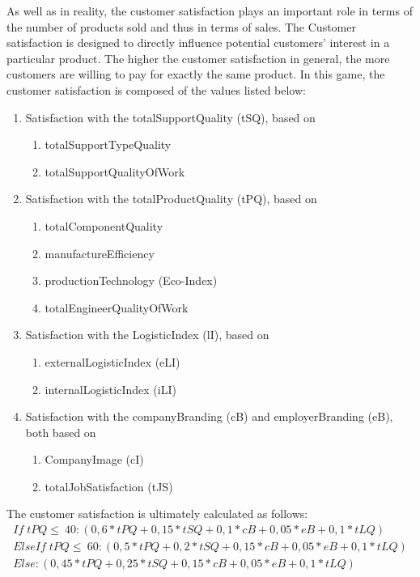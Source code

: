 As well as in reality, the customer satisfaction plays an important role in terms of the number of products sold and thus in terms of sales. %
The Customer satisfaction is designed to directly influence potential customers' interest in a particular product. The higher the customer satisfaction in general, the more customers are willing to pay for exactly the same product. 
In this game, the customer satisfaction is composed of the values listed below:
   \begin{enumerate}
      \item Satisfaction with the totalSupportQuality (tSQ), based on
      \begin{enumerate}
         \item totalSupportTypeQuality
         \item totalSupportQualityOfWork
      \end{enumerate}
      \item Satisfaction with the totalProductQuality (tPQ), based on
      \begin{enumerate}
         \item totalComponentQuality
         \item manufactureEfficiency
         \item productionTechnology (Eco-Index)
         \item totalEngineerQualityOfWork
      \end{enumerate}
      \item Satisfaction with the LogisticIndex (lI), based on
      \begin{enumerate}
         \item externalLogisticIndex (eLI)
         \item internalLogisticIndex (iLI)
      \end{enumerate}
      \item Satisfaction with the companyBranding (cB) and employerBranding (eB), both based on 
      \begin{enumerate}
          \item CompanyImage (cI)
          \item totalJobSatisfaction (tJS)
      \end{enumerate}
   \end{enumerate}
The customer satisfaction is ultimately calculated as follows:
    \begin{equation}
    \begin{aligned}
    If \; tPQ \leq \ 40: (0,6*tPQ + 0,15*tSQ + 0,1*cB + 0,05*eB + 0,1*tLQ)\\
    ElseIf \; tPQ \leq \ 60: (0,5*tPQ + 0,2*tSQ + 0,15*cB + 0,05*eB + 0,1*tLQ)\\
    Else: (0,45*tPQ + 0,25*tSQ + 0,15*cB + 0,05*eB + 0,1*tLQ)
    \end{aligned}
    \end{equation}

